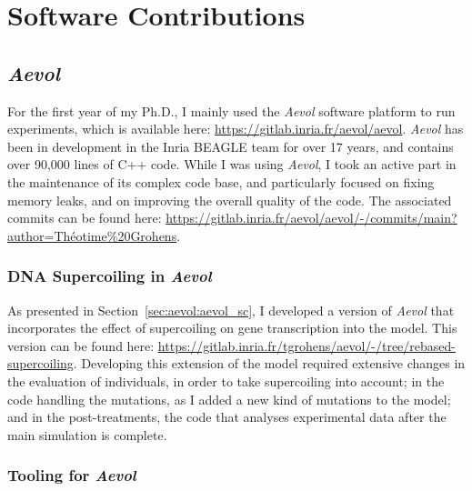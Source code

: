 \chapter{Software Contributions}
\label{chap:soft}

\section{\emph{Aevol}}

For the first year of my Ph.D., I mainly used the \emph{Aevol} software platform to run experiments, which is available here: \url{https://gitlab.inria.fr/aevol/aevol}.
\emph{Aevol} has been in development in the Inria BEAGLE team for over 17 years, and contains over 90,000 lines of C++ code.
While I was using \emph{Aevol}, I took an active part in the maintenance of its complex code base, and particularly focused on fixing memory leaks, and on improving the overall quality of the code.
The associated commits can be found here: \url{https://gitlab.inria.fr/aevol/aevol/-/commits/main?author=Théotime%20Grohens}.

\subsection{DNA Supercoiling in \emph{Aevol}}

As presented in Section~\ref{sec:aevol:aevol_sc}, I developed a version of \emph{Aevol} that incorporates the effect of supercoiling on gene transcription into the model.
This version can be found here: \url{https://gitlab.inria.fr/tgrohens/aevol/-/tree/rebased-supercoiling}.
Developing this extension of the model required extensive changes in the evaluation of individuals, in order to take supercoiling into account; in the code handling the mutations, as I added a new kind of mutations to the model; and in the post-treatments, the code that analyses experimental data after the main simulation is complete.

\subsection{Tooling for \emph{Aevol}}

